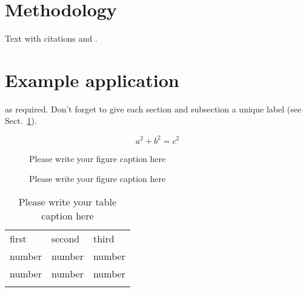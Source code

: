 \documentclass[twocolumn,draft]{svjour3}
\begin{document}
\section{Methodology}
\label{method}

Text with citations \cite{RefB} and \cite{RefJ}.

\section{Example application}
\label{application}
as required. Don't forget to give each section
and subsection a unique label (see Sect.~\ref{method}).

\begin{equation}
a^2+b^2=c^2
\end{equation}

\begin{figure}
\caption{Please write your figure caption here}
\label{fig:1}       %
\end{figure}

\begin{figure*}
\caption{Please write your figure caption here}
\label{fig:2}       %
\end{figure*}

\begin{table}
\caption{Please write your table caption here}
\label{tab:1}       %
\begin{tabular}{lll}
\hline\noalign{\smallskip}
first & second & third  \\
\noalign{\smallskip}\hline\noalign{\smallskip}
number & number & number \\
number & number & number \\
\noalign{\smallskip}\hline
\end{tabular}
\end{table}

\end{document}
